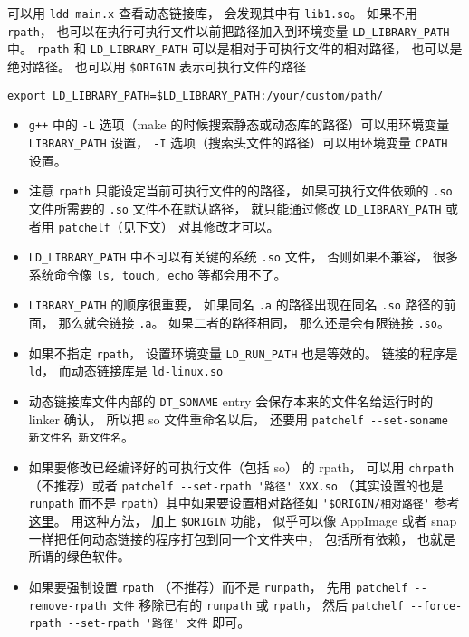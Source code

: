 可以用 \verb|ldd main.x| 查看动态链接库， 会发现其中有 \verb|lib1.so|。 如果不用 \verb|rpath|， 也可以在执行可执行文件以前把路径加入到环境变量 \verb`LD_LIBRARY_PATH` 中。 \verb|rpath| 和 \verb|LD_LIBRARY_PATH| 可以是相对于可执行文件的相对路径， 也可以是绝对路径。 也可以用 \verb|$ORIGIN| 表示可执行文件的路径
\begin{lstlisting}[language=none]
export LD_LIBRARY_PATH=$LD_LIBRARY_PATH:/your/custom/path/
\end{lstlisting}
\begin{itemize}
\item \verb|g++| 中的 \verb|-L| 选项（make 的时候搜索静态或动态库的路径）可以用环境变量 \verb|LIBRARY_PATH| 设置， \verb|-I| 选项（搜索头文件的路径）可以用环境变量 \verb|CPATH| 设置。
\item 注意 \verb|rpath| 只能设定当前可执行文件的的路径， 如果可执行文件依赖的 \verb|.so| 文件所需要的 \verb|.so| 文件不在默认路径， 就只能通过修改 \verb`LD_LIBRARY_PATH` 或者用 \verb|patchelf|（见下文） 对其修改才可以。
\item \verb|LD_LIBRARY_PATH| 中不可以有关键的系统 \verb|.so| 文件， 否则如果不兼容， 很多系统命令像 \verb|ls, touch, echo| 等都会用不了。
\item \verb|LIBRARY_PATH| 的顺序很重要， 如果同名 \verb|.a| 的路径出现在同名 \verb|.so| 路径的前面， 那么就会链接 \verb|.a|。 如果二者的路径相同， 那么还是会有限链接 \verb|.so|。
\item 如果不指定 \verb|rpath|， 设置环境变量 \verb|LD_RUN_PATH| 也是等效的。 链接的程序是 \verb|ld|， 而动态链接库是 \verb|ld-linux.so|
\item 动态链接库文件内部的 \verb|DT_SONAME| entry 会保存本来的文件名给运行时的 linker 确认， 所以把 so 文件重命名以后， 还要用 \verb|patchelf --set-soname 新文件名 新文件名|。
\item 如果要修改已经编译好的可执行文件（包括 so） 的 rpath， 可以用 \verb|chrpath| （不推荐）或者 \verb|patchelf --set-rpath '路径' XXX.so| （其实设置的也是 \verb|runpath| 而不是 \verb|rpath|）其中如果要设置相对路径如 \verb|'$ORIGIN/相对路径'| 参考\href{https://stackoverflow.com/questions/13769141/can-i-change-rpath-in-an-already-compiled-binary}{这里}。 用这种方法， 加上 \verb|$ORIGIN| 功能， 似乎可以像 AppImage 或者 snap 一样把任何动态链接的程序打包到同一个文件夹中， 包括所有依赖， 也就是所谓的绿色软件。
\item 如果要强制设置 \verb|rpath| （不推荐）而不是 \verb|runpath|， 先用 \verb|patchelf --remove-rpath 文件| 移除已有的 \verb|runpath| 或 \verb|rpath|， 然后 \verb|patchelf --force-rpath --set-rpath '路径' 文件| 即可。

\end{itemize}
